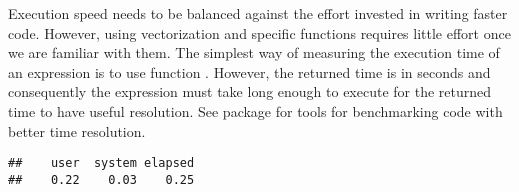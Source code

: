 \documentclass[krantz2]{krantz}\usepackage{knitr}%
\begin{document}
Execution speed needs to be balanced against the effort invested in writing faster code. However, using vectorization and specific \Rlang functions requires little effort once we are familiar with them. The simplest way of measuring the execution time of an \Rlang expression is to use function . However, the returned time is in seconds and consequently the expression must take long enough to execute for the returned time to have useful resolution. See package  for tools for benchmarking code with better time resolution.

\begin{knitrout}\footnotesize
{}\color{fgcolor}\begin{kframe}
\begin{alltt}
 \hlkwb{<-} \hlstd{()}
               \hlopt{:}\hlstd{) \{}
               \hlkwb{<-}  \hlopt{/} 
              \hlstd{\}}
            \hlstd{\})}
\end{alltt}
\begin{verbatim}
##    user  system elapsed 
##    0.22    0.03    0.25
\end{verbatim}
\end{kframe}
\end{knitrout}
\end{document}
